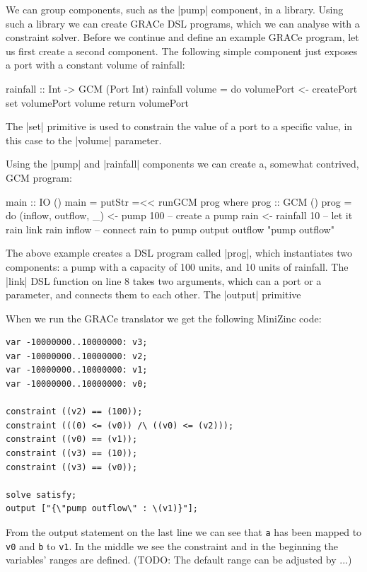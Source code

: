 \documentclass{article}
\begin{document}
We can group components, such as the |pump| component, in a library. Using such
a library we can create GRACe DSL programs, which we can analyse with a
constraint solver. Before we continue and define an example GRACe program, let
us first create a second component. The following simple component just exposes
a port with a constant volume of rainfall:
\begin{haskellcode}
rainfall :: Int -> GCM (Port Int)
rainfall volume = do
  volumePort <- createPort
  set volumePort volume
  return volumePort
\end{haskellcode}
The |set| primitive is used to constrain the value of a port to a specific value,
in this case to the |volume| parameter. 

Using the |pump| and |rainfall| components we can create a, somewhat contrived,
\ac{GCM} program:
\begin{haskellcode}
main :: IO ()
main = putStr =<< runGCM prog
  where
    prog :: GCM ()
    prog = do
      (inflow, outflow, _) <- pump 100  -- create a pump
      rain <- rainfall 10               -- let it rain
      link rain inflow                  -- connect rain to pump
      output outflow "pump outflow"
\end{haskellcode}
The above example creates a DSL program called |prog|, which instantiates two
components: a pump with a capacity of 100 units, and 10 units of rainfall. The
|link| DSL function on line 8 takes two arguments, which can a port or a
parameter, and connects them to each other. The |output| primitive 

When we run the GRACe translator we get the following MiniZinc code:
%
\begin{verbatim}
var -10000000..10000000: v3;
var -10000000..10000000: v2;
var -10000000..10000000: v1;
var -10000000..10000000: v0;

constraint ((v2) == (100));
constraint (((0) <= (v0)) /\ ((v0) <= (v2)));
constraint ((v0) == (v1));
constraint ((v3) == (10));
constraint ((v3) == (v0));

solve satisfy;
output ["{\"pump outflow\" : \(v1)}"];
\end{verbatim}
%
From the output statement on the last line we can see that \texttt{a} has
been mapped to \texttt{v0} and \texttt{b} to \texttt{v1}.
%
In the middle we see the constraint and in the beginning the
variables' ranges are defined.
%
(TODO: The default range can be adjusted by ...)

\end{document}
